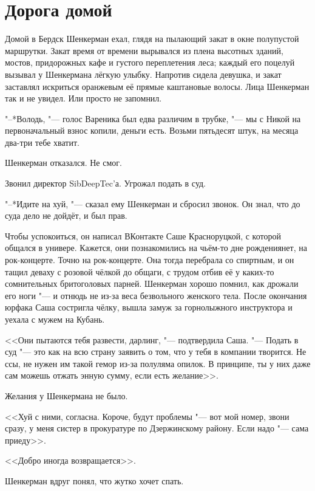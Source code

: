 \section{Дорога домой}

Домой в Бердск Шенкерман ехал, глядя на пылающий закат в окне полупустой маршрутки.
Закат время от времени вырывался из плена высотных зданий, мостов, придорожных кафе и густого переплетения леса;
каждый его поцелуй вызывал у Шенкермана лёгкую улыбку.
Напротив сидела девушка, и закат заставлял искриться оранжевым её прямые каштановые волосы.
Лица Шенкерман так и не увидел.
Или просто не запомнил.

"--*Володь, "--- голос Вареника был едва различим в трубке, "--- мы с Никой на первоначальный взнос копили, деньги есть.
Возьми пятьдесят штук, на месяца два-три тебе хватит.

Шенкерман отказался.
Не смог.

Звонил директор SibDeepTec'а.
Угрожал подать в суд.

"--*Идите на хуй, "--- сказал ему Шенкерман и сбросил звонок.
Он знал, что до суда дело не дойдёт, и был прав.

Чтобы успокоиться, он написал ВКонтакте Саше Красноруцкой, с которой общался в универе.
Кажется, они познакомились на чьём-то дне рождения\ldotst нет, на рок-концерте.
Точно на рок-концерте.
Она тогда перебрала со спиртным, и он тащил деваху с розовой чёлкой до общаги, с трудом отбив её у каких-то сомнительных бритоголовых парней.
Шенкерман хорошо помнил, как дрожали его ноги "--- и отнюдь не из-за веса безвольного женского тела.
После окончания юрфака Саша состригла чёлку, вышла замуж за горнолыжного инструктора и уехала с мужем на Кубань.

<<Они пытаются тебя развести, дарлинг, "--- подтвердила Саша.
"--- Подать в суд "--- это как на всю страну заявить о том, что у тебя в компании творится.
Не ссы, не нужен им такой гемор из-за полуляма опилок.
В принципе, ты у них даже сам можешь отжать энную сумму, если есть желание>>.

Желания у Шенкермана не было.

<<Хуй с ними, согласна.
Короче, будут проблемы "--- вот мой номер, звони сразу, у меня систер в прокуратуре по Дзержинскому району.
Если надо "--- сама приеду>>.

<<Добро иногда возвращается>>.

Шенкерман вдруг понял, что жутко хочет спать.

\section{\spacing}

